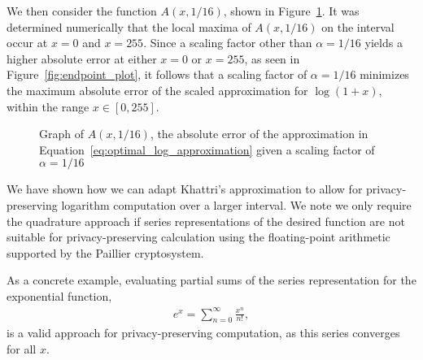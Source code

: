 We then consider the function $A\left(x,1/16\right)$, shown in Figure~\ref{fig:single_alpha_plot}.
It was determined numerically that the local maxima of $A\left(x,1/16\right)$ on the interval occur at $x=0$ and $x=255$. Since a scaling factor other than $\alpha=1/16$ yields a higher absolute error at either $x=0$ or $x=255$, as seen in Figure~\ref{fig:endpoint_plot}, it follows that a scaling factor of $\alpha = 1/16$ minimizes the maximum absolute error of the scaled approximation for $\log{\left(1+x\right)}$, within the range $x \in [0, 255]$.
\begin{figure}[ht]
	\centering
	\caption{Graph of $A\left(x,1/16\right)$, the absolute error of the approximation in Equation~\ref{eq:optimal_log_approximation} given a scaling factor of $\alpha=1/16$}
	\label{fig:single_alpha_plot}
\end{figure}

We have shown how we can adapt Khattri's approximation to allow for privacy-preserving logarithm computation over a larger interval. We note we only require the quadrature approach if series representations of the desired function are not suitable for privacy-preserving calculation using the floating-point arithmetic supported by the Paillier cryptosystem.

As a concrete example, evaluating partial sums of the series representation for the exponential function,
\begin{align*}
	e^x = \sum_{n=0}^{\infty}{\frac{x^n}{n!}},
\end{align*}
is a valid approach for privacy-preserving computation, as this series converges for all $x$.
